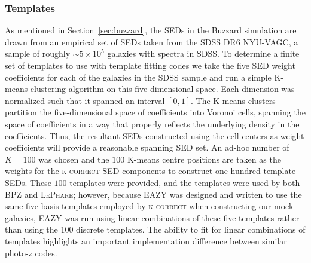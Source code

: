 \subsubsection{Templates}
\label{sec:buzztemplates}
As mentioned in Section~\ref{sec:buzzard}, the SEDs in the Buzzard simulation are drawn from an empirical set of SEDs taken from the SDSS DR6 NYU-VAGC, a sample of roughly $\sim5\times 10^{5}$ galaxies with spectra in SDSS. To determine a finite set of templates to use with template fitting codes we take the five SED weight coefficients for each of the galaxies in the SDSS sample and run a simple K-means clustering algorithm on this five dimensional space. Each dimension was normalized such that it spanned an interval $[0,1]$.  The K-means clusters partition the five-dimensional space of coefficients into Voronoi cells, spanning the space of coefficients in a way that properly reflects the underlying density in the coefficients. Thus, the resultant SEDs constructed using the cell centers as weight coefficients will provide a reasonable spanning SED set. An ad-hoc number of $K=100$ was chosen and the $100$ K-means centre positions are taken as the weights for the \textsc{k-correct} SED components to construct one hundred template SEDs. These $100$ templates were provided,
and the templates were used by both \textsc{BPZ} and \textsc{LePhare}; however, because EAZY was designed and written to use the same five basis templates employed by \textsc{k-correct} when constructing our mock galaxies, EAZY was run using linear combinations of these five templates rather than using the 100 discrete templates.  The ability to fit for linear combinations of templates highlights an important implementation difference between similar photo-z codes.


